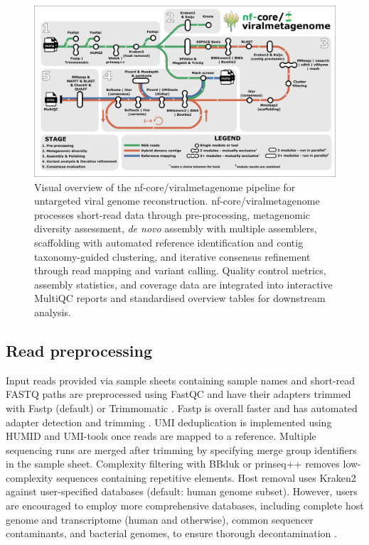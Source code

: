 \begin{figure}[htbp]
    \centering
    \includegraphics[width=1\textwidth]{Fig/fig1.png}
    \caption{Visual overview of the nf-core/viralmetagenome pipeline for untargeted viral genome reconstruction. nf-core/viralmetagenome processes short-read data through pre-processing, metagenomic diversity assessment, \textit{de novo} assembly with multiple assemblers, scaffolding with automated reference identification and contig taxonomy-guided clustering, and iterative consensus refinement through read mapping and variant calling. Quality control metrics, assembly statistics, and coverage data are integrated into interactive MultiQC reports and standardised overview tables for downstream analysis.}
    \label{fig:pipeline-workflow}
\end{figure}

\subsection{Read preprocessing}

Input reads provided via sample sheets containing sample names and short-read FASTQ paths are preprocessed using FastQC and have their adapters trimmed with Fastp \cite{Chen2018-tu} (default) or Trimmomatic \cite{Bolger2014-si}. Fastp is overall faster and has automated adapter detection and trimming \cite{Chen2018-tu}. UMI deduplication is implemented using HUMID \cite{LarosUnknown-nx} and UMI-tools \cite{Smith2017-nk} once reads are mapped to a reference. Multiple sequencing runs are merged after trimming by specifying merge group identifiers in the sample sheet. Complexity filtering with BBduk \cite{BushnellUnknown-qy} or prinseq++ \cite{Cantu2019-vs} removes low-complexity sequences containing repetitive elements. Host removal uses Kraken2 \cite{Wood2019-jl} against user-specified databases (default: human genome subset). However, users are encouraged to employ more comprehensive databases, including complete host genome and transcriptome (human and otherwise), common sequencer contaminants, and bacterial genomes, to ensure thorough decontamination \cite{Forbes2025-mv}.

